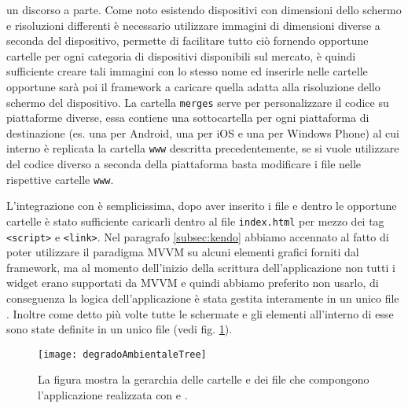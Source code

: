             un discorso a parte. Come noto esistendo
            dispositivi con dimensioni dello schermo e risoluzioni differenti
            è necessario utilizzare immagini di dimensioni diverse a seconda
            del dispositivo, \pg{} permette di facilitare tutto ciò fornendo
            opportune cartelle per ogni categoria di dispositivi disponibili sul
            mercato, è quindi sufficiente creare tali immagini con lo stesso nome
            ed inserirle nelle cartelle opportune sarà poi il framework a caricare
            quella adatta alla risoluzione dello schermo del dispositivo.
            La cartella \texttt{merges} serve per personalizzare il codice su piattaforme
            diverse, essa contiene una sottocartella per ogni piattaforma di destinazione
            (es. una per Android, una per iOS e una per Windows Phone)
            al cui interno è replicata la cartella \texttt{www} descritta precedentemente,
            se si vuole utilizzare del codice diverso a seconda della piattaforma
            basta modificare i file nelle rispettive cartelle \texttt{www}.

            L'integrazione con \kendomob{} è semplicissima, dopo aver inserito
            i file \js{} e \css{} dentro le opportune cartelle è stato sufficiente
            caricarli dentro al file \texttt{index.html} per mezzo dei tag
            \texttt{<script>} e \texttt{<link>}.
            Nel paragrafo \ref{subsec:kendo} abbiamo accennato al fatto di poter
            utilizzare il paradigma MVVM su alcuni elementi grafici forniti dal
            framework, ma al momento dell'inizio della scrittura dell'applicazione
            non tutti i widget erano supportati da MVVM e quindi abbiamo preferito
            non usarlo, di conseguenza la logica dell'applicazione è stata gestita
            interamente in un unico file \js{}. Inoltre come detto più volte
            tutte le schermate e gli elementi all'interno di esse sono state
            definite in un unico file \html{} (vedi fig. \ref{fig:degradoAmbientaleTree}).
            \begin{figure}[h]
                \centering
                \texttt{[image: degradoAmbientaleTree]}
                \caption{
                La figura mostra la gerarchia delle cartelle e dei file che
                compongono l'applicazione realizzata con \pg{} e \kendomob{}.
                }
                \label{fig:degradoAmbientaleTree}
            \end{figure}


